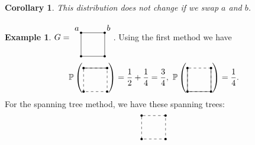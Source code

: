 \documentclass{report}
\newcommand{\matP}{\mathbb{P}}
\newtheorem{corollary}{Corollary}[section]
\theoremstyle{definition}
\newtheorem{example}{Example}[section]
\theoremstyle{remark}
\numberwithin{equation}{section}
\begin{document}
\begin{corollary}
    This distribution does not change if we swap $a$ and $b$.
\end{corollary}
\begin{example}
    $G = \begin{tikzpicture}[baseline=(current bounding box.center)]
        \node[shape=circle, fill=black, scale = 0.3] (A1) at (0, 0) {};
        \node[shape=circle, fill=black, scale = 0.3] (A2) at (1, 0) {};
        \node[shape=circle, fill=black, scale = 0.3] (A3) at (1, 1) {};
        \node[shape=circle, fill=black, scale = 0.3] (A4) at (0, 1) {};

        \node[above left] at (A4.south east) {$a$};
        \node[above right] at (A3.south west) {$b$};

        \draw[black] (0, 0) rectangle (1, 1);
    \end{tikzpicture}$.
    Using the first method we have
    \[\matP\left(\begin{tikzpicture}[baseline=(current bounding box.center)]
        \node[shape=circle, fill=black, scale = 0.3] (A1) at (0, 0) {};
        \node[shape=circle, fill=black, scale = 0.3] (A2) at (1, 0) {};
        \node[shape=circle, fill=black, scale = 0.3] (A3) at (1, 1) {};
        \node[shape=circle, fill=black, scale = 0.3] (A4) at (0, 1) {};

        \draw[] (A4) -- (A3);


        \draw[black, dashed] (0, 0) rectangle (1, 1);
    \end{tikzpicture} \right) = \frac{1}{2} + \frac{1}{4} = \frac{3}{4}, \ \matP\left(\begin{tikzpicture}[baseline=(current bounding box.center)]
        \node[shape=circle, fill=black, scale = 0.3] (A1) at (0, 0) {};
        \node[shape=circle, fill=black, scale = 0.3] (A2) at (1, 0) {};
        \node[shape=circle, fill=black, scale = 0.3] (A3) at (1, 1) {};
        \node[shape=circle, fill=black, scale = 0.3] (A4) at (0, 1) {};

        \draw[] (A4) -- (A1) -- (A2) -- (A3);


        \draw[black, dashed] (0, 0) rectangle (1, 1);
    \end{tikzpicture} \right) = \frac{1}{4}.\]
    For the spanning tree method, we have these spanning trees:
    \[\begin{tikzpicture}[baseline=(current bounding box.center)]
        \node[shape=circle, fill=black, scale = 0.3] (A1) at (0, 0) {};
        \node[shape=circle, fill=black, scale = 0.3] (A2) at (1, 0) {};
        \node[shape=circle, fill=black, scale = 0.3] (A3) at (1, 1) {};
        \node[shape=circle, fill=black, scale = 0.3] (A4) at (0, 1) {};
        \draw[black, dashed] (0, 0) rectangle (1, 1);


\end{tikzpicture}\]
\end{example}
\end{document}
